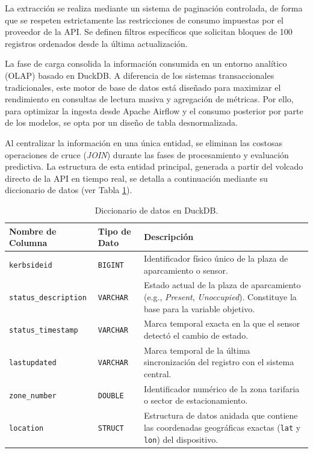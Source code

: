 La extracción se realiza mediante un sistema de paginación controlada, de forma que se respeten estrictamente las restricciones de consumo impuestas por el proveedor de la API. Se definen filtros específicos que solicitan bloques de 100 registros ordenados desde la última actualización. 

La fase de carga consolida la información consumida en un entorno analítico (OLAP) basado en DuckDB. A diferencia de los sistemas transaccionales tradicionales, este motor de base de datos está diseñado para maximizar el rendimiento en consultas de lectura masiva y agregación de métricas. Por ello, para optimizar la ingesta desde Apache Airflow y el consumo posterior por parte de los modelos, se opta por un diseño de tabla desnormalizada. 

Al centralizar la información en una única entidad, se eliminan las costosas operaciones de cruce (\textit{JOIN}) durante las fases de procesamiento y evaluación predictiva. La estructura de esta entidad principal, generada a partir del volcado directo de la API en tiempo real, se detalla a continuación mediante su diccionario de datos (ver Tabla \ref{tab:data_dictionary}).

\begin{table}[htbp]
	\centering
	\caption{Diccionario de datos en DuckDB.}
	\label{tab:data_dictionary}
	\renewcommand{\arraystretch}{1.2}
	\begin{tabular}{p{4.5cm} p{2.5cm} p{8cm}}
		\toprule
		\textbf{Nombre de Columna} & \textbf{Tipo de Dato} & \textbf{Descripción} \\
		\midrule
		\texttt{kerbsideid} & \texttt{BIGINT} & Identificador físico único de la plaza de aparcamiento o sensor. \\
		\texttt{status\_description} & \texttt{VARCHAR} & Estado actual de la plaza de aparcamiento (e.g., \textit{Present}, \textit{Unoccupied}). Constituye la base para la variable objetivo. \\
		\texttt{status\_timestamp} & \texttt{VARCHAR} & Marca temporal exacta en la que el sensor detectó el cambio de estado. \\
		\texttt{lastupdated} & \texttt{VARCHAR} & Marca temporal de la última sincronización del registro con el sistema central. \\
		\texttt{zone\_number} & \texttt{DOUBLE} & Identificador numérico de la zona tarifaria o sector de estacionamiento. \\
		\texttt{location} & \texttt{STRUCT} & Estructura de datos anidada que contiene las coordenadas geográficas exactas (\texttt{lat} y \texttt{lon}) del dispositivo. \\
		\bottomrule
	\end{tabular}
\end{table}

